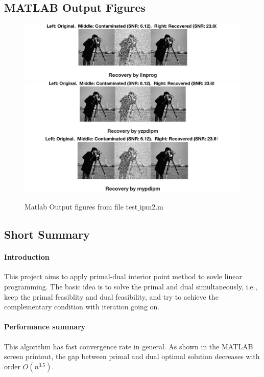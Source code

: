 \subsection*{MATLAB Output Figures}
\begin{figure}[H]
\centering
\includegraphics[width=19cm]{f_2_1}
\includegraphics[width=19cm]{f_2_2}
\includegraphics[width=19cm]{f_2_3}
\caption{Matlab Output figures from file test$\_$ipm2.m}
\end{figure}

\clearpage
\subsection*{Short Summary}
\paragraph{Introduction}
This project aims to apply primal-dual interior point method to sovle linear programming. The basic idea is to solve the primal and dual simultaneously, i.e., keep the primal feasiblity and dual feasibility, and try to achieve the complementary condition with iteration going on.
\paragraph{Performance summary}
This algorithm has fast convergence rate in general. As shown in the MATLAB screen printout, the gap between primal and dual optimal solution decreases with order $O(n^{3.5})$.
